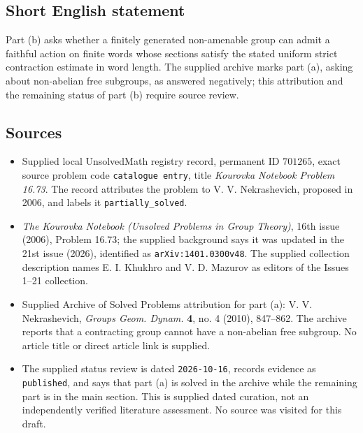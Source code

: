 \documentclass[11pt]{article}
\begin{document}
\subsection{Short English statement}
Part (b) asks whether a finitely generated non-amenable group can admit a faithful action on finite words whose sections satisfy the stated uniform strict contraction estimate in word length. The supplied archive marks part (a), asking about non-abelian free subgroups, as answered negatively; this attribution and the remaining status of part (b) require source review.
\subsection{Sources}
\begin{itemize}
\item Supplied local UnsolvedMath registry record, permanent ID \(701265\), exact source problem code \texttt{catalogue entry}, title \emph{Kourovka Notebook Problem 16.73}. The record attributes the problem to V. V. Nekrashevich, proposed in 2006, and labels it \texttt{partially\_solved}.
\item \emph{The Kourovka Notebook (Unsolved Problems in Group Theory)}, 16th issue (2006), Problem 16.73; the supplied background says it was updated in the 21st issue (2026), identified as \texttt{arXiv:1401.0300v48}. The supplied collection description names E. I. Khukhro and V. D. Mazurov as editors of the Issues 1--21 collection.
\item Supplied Archive of Solved Problems attribution for part (a): V. V. Nekrashevich, \emph{Groups Geom. Dynam.} \textbf{4}, no. 4 (2010), 847--862. The archive reports that a contracting group cannot have a non-abelian free subgroup. No article title or direct article link is supplied.
\item The supplied status review is dated \texttt{2026-10-16}, records evidence as \texttt{published}, and says that part (a) is solved in the archive while the remaining part is in the main section. This is supplied dated curation, not an independently verified literature assessment. No source was visited for this draft.
\end{itemize}
\end{document}
